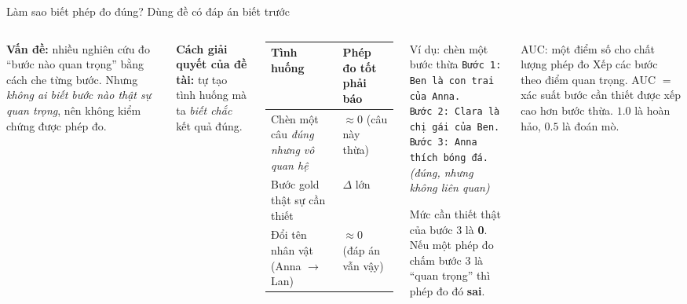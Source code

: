 \documentclass[aspectratio=169,t]{beamer}
\newcommand{\code}[1]{\texttt{#1}}
\begin{document}
\begin{frame}[shrink]{Làm sao biết phép đo đúng? Dùng đề có đáp án biết trước}
\begin{columns}[T,onlytextwidth]
\footnotesize
\textbf{Vấn đề:} nhiều nghiên cứu đo ``bước nào quan trọng'' bằng cách che từng bước. Nhưng \emph{không ai biết bước nào thật sự quan trọng}, nên không kiểm chứng được phép đo.\par\vspace{4pt}
\textbf{Cách giải quyết của đề tài:} tự tạo tình huống mà ta \emph{biết chắc} kết quả đúng.
\vspace{3pt}
\renewcommand{\arraystretch}{1.2}
\scriptsize
\begin{tabularx}{\linewidth}{@{}P{3.2cm}Y@{}}
\toprule
\textbf{Tình huống} & \textbf{Phép đo tốt phải báo}\\
\midrule
Chèn một câu \emph{đúng nhưng vô quan hệ} & $\approx 0$ (câu này thừa)\\
Bước gold thật sự cần thiết & $\Delta$ lớn\\
Đổi tên nhân vật (Anna $\to$ Lan) & $\approx 0$ (đáp án vẫn vậy)\\
\bottomrule
\end{tabularx}
\begin{block}{Ví dụ: chèn một bước thừa}
\scriptsize
\code{Bước 1: Ben là con trai của Anna.}\\
\code{Bước 2: Clara là chị gái của Ben.}\\
\textcolor{failc}{\code{Bước 3: Anna thích bóng đá.}} \emph{(đúng, nhưng không liên quan)}\par\vspace{2pt}
Mức cần thiết thật của bước 3 là \textbf{0}. Nếu một phép đo chấm bước 3 là ``quan trọng'' thì phép đo đó \textbf{sai}.
\end{block}
\begin{exampleblock}{AUC: một điểm số cho chất lượng phép đo}
\scriptsize
Xếp các bước theo điểm quan trọng. AUC $=$ xác suất bước cần thiết được xếp cao hơn bước thừa. $1.0$ là hoàn hảo, $0.5$ là đoán mò.
\end{exampleblock}
\end{columns}
\par\kern0pt
\end{frame}
\end{document}
